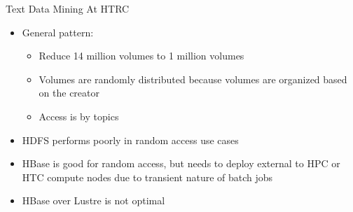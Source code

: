 \documentclass[newPxFont]{beamer}
\begin{document}
\begin{frame}[c]{Text Data Mining At HTRC}
  \begin{itemize}
    \item General pattern: 
    \begin{itemize}
      \item Reduce 14 million volumes to 1 million volumes
      \item Volumes are randomly distributed because volumes are organized based on the creator
      \item Access is by topics
    \end{itemize}
    \item HDFS performs poorly in random access use cases
    \item HBase is good for random access, but needs to deploy external to HPC or HTC compute nodes due to transient nature of batch jobs
    \item HBase over Lustre is not optimal
  \end{itemize}
\end{frame}
\end{document}
